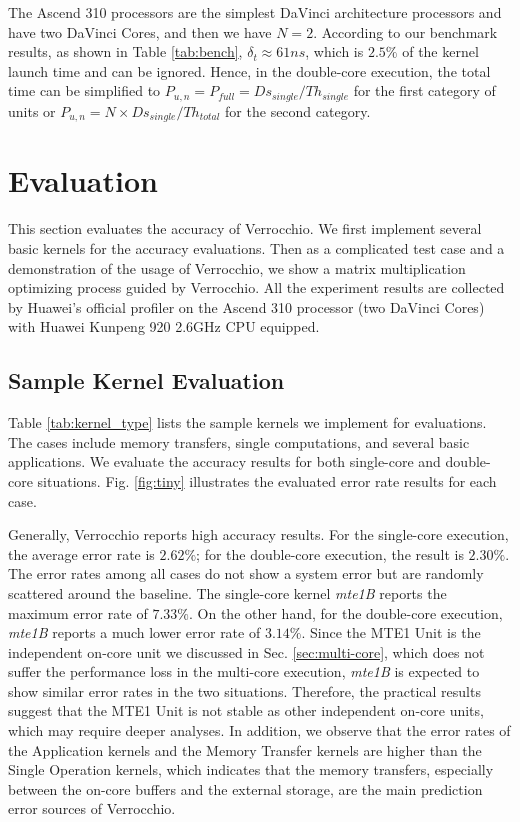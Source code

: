 \documentclass[12pt]{extbook}
\begin{document}
The Ascend 310 processors are the simplest DaVinci architecture processors and have two DaVinci Cores, and then we have $N = 2$. According to our benchmark results, as shown in Table \ref{tab:bench}, $\delta_{t} \approx 61 ns$, which is $2.5\%$ of the kernel launch time and can be ignored. Hence, in the double-core execution, the total time can be simplified to $P_{u, n} = P_{full} = Ds_{single} / Th_{single}$ for the first category of units or $P_{u, n} = N \times Ds_{single} / Th_{total}$ for the second category.


\section{Evaluation}

This section evaluates the accuracy of Verrocchio. We first implement several basic kernels for the accuracy evaluations. Then as a complicated test case and a demonstration of the usage of Verrocchio, we show a matrix multiplication optimizing process guided by Verrocchio. All the experiment results are collected by Huawei's official profiler on the Ascend 310 processor (two DaVinci Cores) with Huawei Kunpeng 920 2.6GHz CPU equipped.

\subsection{Sample Kernel Evaluation}

Table \ref{tab:kernel_type} lists the sample kernels we implement for evaluations. The cases include memory transfers, single computations, and several basic applications. We evaluate the accuracy results for both single-core and double-core situations. Fig. \ref{fig:tiny} illustrates the evaluated error rate results for each case.

Generally, Verrocchio reports high accuracy results. For the single-core execution, the average error rate is $2.62\%$; for the double-core execution, the result is $2.30\%$. The error rates among all cases do not show a system error but are randomly scattered around the baseline. The single-core kernel \textit{mte1B} reports the maximum error rate of $7.33\%$. On the other hand, for the double-core execution, \textit{mte1B} reports a much lower error rate of $3.14\%$. Since the MTE1 Unit is the independent on-core unit we discussed in Sec. \ref{sec:multi-core}, which does not suffer the performance loss in the multi-core execution, \textit{mte1B} is expected to show similar error rates in the two situations. Therefore, the practical results suggest that the MTE1 Unit is not stable as other independent on-core units, which may require deeper analyses. In addition, we observe that the error rates of the Application kernels and the Memory Transfer kernels are higher than the Single Operation kernels, which indicates that the memory transfers, especially between the on-core buffers and the external storage, are the main prediction error sources of Verrocchio.
\end{document}
